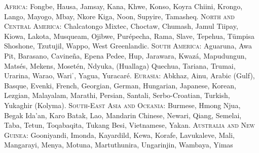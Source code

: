 \documentclass[output=paper]{langsci/langscibook}
\begin{document}
\textsc{Africa}: Fongbe, Hausa, Jamsay, Kana, Khwe, Konso, Koyra Chiini, Krongo, Lango, Mayogo, Mbay, Nkore Kiga, Noon, Supyire, Tamasheq. 
\textsc{North and Central America}: Chalcatongo Mixtec, Choctaw, Chumash, Jamul Tiipay, Kiowa, Lakota, Musqueam, Ojibwe, Purépecha, Rama, Slave, Tepehua, Tümpisa Shoshone, Tzutujil, Wappo, West Greenlandic. 
\textsc{South America:} Aguaruna, Awa Pit, Barasano, Cavineña, Epena Pedee, Hup, Jarawara, Kwazá, Mapudungun, Matsés, Mekens, Mosetén, Ndyuka, (Huallaga) Quechua, Tariana, Trumai, Urarina, Warao, Wariˈ, Yagua, Yuracaré. 
\textsc{Eurasia:} Abkhaz, Ainu, Arabic (Gulf), Basque, Evenki, French, Georgian, German, Hungarian, Japanese, Korean, Lezgian, Malayalam, Marathi, Persian, Santali, Serbo-Croatian, Turkish, Yukaghir (Kolyma). 
\textsc{South-East Asia and Oceania:} Burmese, Hmong Njua, Begak Ida’an, Karo Batak, Lao, Mandarin Chinese, Newari, Qiang, Semelai, Taba, Tetun, Toqabaqita, Tukang Besi, Vietnamese, Yakan. 
\textsc{Australia and New Guinea:} Gooniyandi, Imonda, Kayardild, Kewa, Korafe, Lavukaleve, Mali, Mangarayi, Menya, Motuna, Martuthunira, Ungarinjin, Wambaya, Yimas
 
  
\sloppy
\printbibliography[heading=subbibliography,notkeyword=this] 
\end{document}

